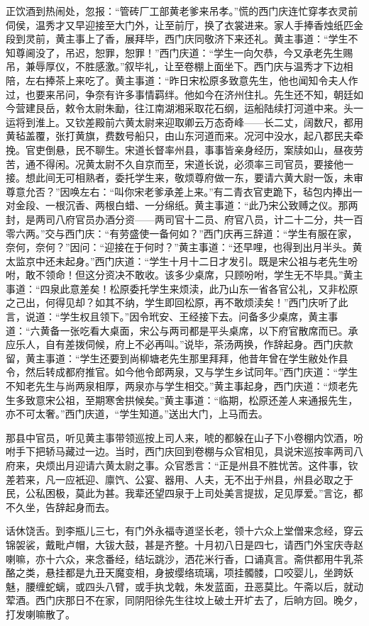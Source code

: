 正饮酒到热闹处，忽报：“管砖厂工部黄老爹来吊孝。”慌的西门庆连忙穿孝衣灵前伺侯，温秀才又早迎接至大门外，让至前厅，换了衣裳进来。家人手捧香烛纸匹金段到灵前，黄主事上了香，展拜毕，西门庆同敬济下来还礼。黄主事道：“学生不知尊阃没了，吊迟，恕罪，恕罪！”西门庆道：“学生一向欠恭，今又承老先生赐吊，兼辱厚仪，不胜感激。”叙毕礼，让至卷棚上面坐下。西门庆与温秀才下边相陪，左右捧茶上来吃了。黄主事道：“昨日宋松原多致意先生，他也闻知令夫人作过，也要来吊问，争奈有许多事情羁绊。他如今在济州住扎。先生还不知，朝廷如今营建艮岳，敕令太尉朱勔，往江南湖湘采取花石纲，运船陆续打河道中来。头一运将到淮上。又钦差殿前六黄太尉来迎取卿云万态奇峰——长二丈，阔数尺，都用黄毡盖覆，张打黄旗，费数号船只，由山东河道而来。况河中没水，起八郡民夫牵挽。官吏倒悬，民不聊生。宋道长督率州县，事事皆亲身经历，案牍如山，昼夜劳苦，通不得闲。况黄太尉不久自京而至，宋道长说，必须率三司官员，要接他一接。想此间无可相熟者，委托学生来，敬烦尊府做一东，要请六黄大尉一饭，未审尊意允否？”因唤左右：“叫你宋老爹承差上来。”有二青衣官吏跪下，毡包内捧出一对金段、一根沉香、两根白蜡、一分绵纸。黄主事道：“此乃宋公致赙之仪。那两封，是两司八府官员办酒分资——两司官十二员、府官八员，计二十二分，共一百零六两。”交与西门庆：“有劳盛使一备何如？”西门庆再三辞道：“学生有服在家，奈何，奈何？”因问：“迎接在于何时？”黄主事道：“还早哩，也得到出月半头。黄太监京中还未起身。”西门庆道：“学生十月十二日才发引。既是宋公祖与老先生吩咐，敢不领命！但这分资决不敢收。该多少桌席，只顾吩咐，学生无不毕具。”黄主事道：“四泉此意差矣！松原委托学生来烦渎，此乃山东一省各官公礼，又非松原之己出，何得见却？如其不纳，学生即回松原，再不敢烦渎矣！”西门庆听了此言，说道：“学生权且领下。”因令玳安、王经接下去。问备多少桌席，黄主事道：“六黄备一张吃看大桌面，宋公与两司都是平头桌席，以下府官散席而已。承应乐人，自有差拨伺候，府上不必再叫。”说毕，茶汤两换，作辞起身。西门庆款留，黄主事道：“学生还要到尚柳塘老先生那里拜拜，他昔年曾在学生敝处作县令，然后转成都府推官。如今他令郎两泉，又与学生乡试同年。”西门庆道：“学生不知老先生与尚两泉相厚，两泉亦与学生相交。”黄主事起身，西门庆道：“烦老先生多致意宋公祖，至期寒舍拱候矣。”黄主事道：“临期，松原还差人来通报先生，亦不可太奢。”西门庆道，“学生知道。”送出大门，上马而去。

那县中官员，听见黄主事带领巡按上司人来，唬的都躲在山子下小卷棚内饮酒，吩咐手下把轿马藏过一边。当时，西门庆回到卷棚与众官相见，具说宋巡按率两司八府来，央烦出月迎请六黄太尉之事。众官悉言：“正是州县不胜忧苦。这件事，钦差若来，凡一应衹迎、廪饩、公宴、器用、人夫，无不出于州县，州县必取之于民，公私困极，莫此为甚。我辈还望四泉于上司处美言提拔，足见厚爱。”言讫，都不久坐，告辞起身而去。

话休饶舌。到李瓶儿三七，有门外永福寺道坚长老，领十六众上堂僧来念经，穿云锦袈裟，戴毗卢帽，大钹大鼓，甚是齐整。十月初八日是四七，请西门外宝庆寺赵喇嘛，亦十六众，来念番经，结坛跳沙，洒花米行香，口诵真言。斋供都用牛乳茶酪之类，悬挂都是九丑天魔变相，身披缨络琉璃，项挂髑髅，口咬婴儿，坐跨妖魅，腰缠蛇螭，或四头八臂，或手执戈戟，朱发蓝面，丑恶莫比。午斋以后，就动荤酒。西门庆那日不在家，同阴阳徐先生往坟上破土开圹去了，后晌方回。晚夕，打发喇嘛散了。

